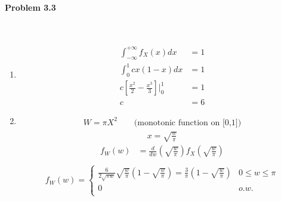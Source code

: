 \documentclass[12pt, letterpaper]{scrartcl}
\begin{document}
\paragraph*{Problem 3.3} \hfill\\
\begin{enumerate}[((a))]
    \item
    \begin{align*}
        \int^{+\infty}_{-\infty}f_X(x)dx&=1\\
        \int^{1}_{0}cx(1-x)dx&=1\\
        c[\frac{x^2}{2}-\frac{x^3}{3}]\bigg\rvert^{1}_{0}&=1\\
        c&=6
    \end{align*}
    \item
    \begin{align*}
        W=\pi X^2 \qquad \textrm{(monotonic function on [0,1])}
    \end{align*}
    \begin{align*}
        x=\sqrt{\frac{w}{\pi}}
    \end{align*}
    \begin{align*}
        f_W(w)&=\frac{d}{dw}(\sqrt{\frac{w}{\pi}})f_X(\sqrt{\frac{w}{\pi}})\\
    \end{align*}
    \begin{align*}
        f_W(w)=
        \begin{cases} 
            \frac{6}{2\sqrt{\pi w}}\sqrt{\frac{w}{\pi}}(1-\sqrt{\frac{w}{\pi}})=\frac{3}{\pi}(1-\sqrt{\frac{w}{\pi}}) & 0 \leq w \leq \pi\\
            0 & o.w.\\
        \end{cases}
    \end{align*}
    

\end{enumerate}
\end{document}
